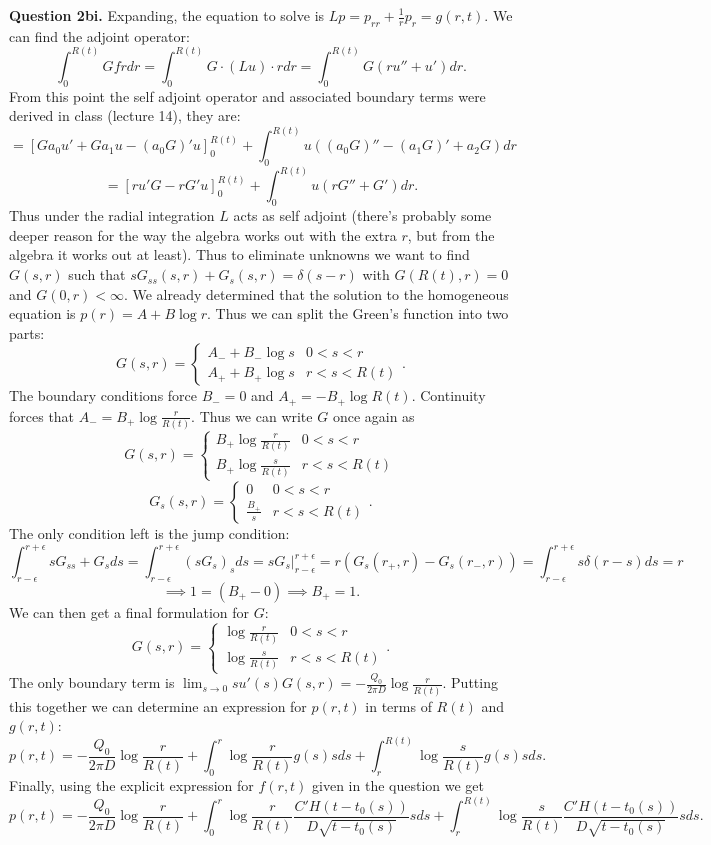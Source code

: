 \documentclass[letterpaper, reqno,11pt]{article}
\begin{document}
{\medskip\noindent\bf Question 2bi.} Expanding, the equation to solve is $Lp=p_{rr}+\frac{1}{r}p_r=g(r,t)$. We can find the adjoint operator:
\[
\int_0^{R(t)}Gfrdr=\int_0^{R(t)}G\cdot (Lu)\cdot rdr=\int_0^{R(t)}G\left( ru''+u' \right) dr
.\]
From this point the self adjoint operator and associated boundary terms were derived in class (lecture 14), they are:
\[
  =\left[Ga_0u'+Ga_1u-(a_0G)'u\right]_{0}^{R(t)}+\int_{0}^{R(t)}u\left( (a_0G)''-(a_1G)'+a_2G \right) dr
\]
\[
  =\left[ru'G-rG'u\right]_0^{R(t)}+\int_0^{R(t)}u\left( rG''+G' \right) dr
.\]
Thus under the radial integration $L$ acts as self adjoint (there's probably some deeper reason for the way the algebra works out with the extra $r$, but from the algebra it works out at least). Thus to eliminate unknowns we want to find $G(s,r)$ such that $sG_{ss}(s,r)+G_s(s,r)=\delta(s-r)$ with $G(R(t),r)=0$ and $G(0,r)<\infty$. We already determined that the solution to the homogeneous equation is $p(r)=A+B\log r$. Thus we can split the Green's function into two parts:
\[
G(s,r)=\begin{cases}
  A_-+B_-\log s&0<s<r\\
  A_++B_+\log s&r<s<R(t)
\end{cases}
.\]
The boundary conditions force $B_-= 0$ and $A_+=-B_+\log R(t)$. Continuity forces that $A_-=B_+\log \frac{r}{R(t)}$. Thus we can write $G$ once again as
\[
G(s,r)=\begin{cases}
  B_+\log \frac{r}{R(t)}&0<s<r\\
  B_+\log \frac{s}{R(t)}&r<s<R(t)
\end{cases}
\]
\[
G_s(s,r)=\begin{cases}
  0&0<s<r\\
  \frac{B_+}{s}&r<s<R(t)
\end{cases}
.\]
The only condition left is the jump condition:
\[
\int_{r-\epsilon}^{r+\epsilon}sG_{ss}+G_sds=\int_{r-\epsilon}^{r+\epsilon}(sG_s)_sds=sG_s\bigg|_{r-\epsilon}^{r+\epsilon}=r\left( G_s(r_+,r)-G_s(r_-,r) \right)=\int_{r-\epsilon}^{r+\epsilon}s\delta(r-s)ds=r
\]
\[
\implies 1=(B_+-0)\implies B_+=1
.\]
We can then get a final formulation for $G$:
\[
G(s,r)=\begin{cases}
  \log \frac{r}{R(t)}&0<s<r\\
  \log \frac{s}{R(t)}&r<s<R(t)
\end{cases}.\]
The only boundary term is $\lim_{s\to 0}su'(s)G(s,r)=-\frac{Q_0}{2\pi D}\log \frac{r}{R(t)}$. Putting this together we can determine an expression for $p(r,t)$ in terms of $R(t)$ and $g(r,t)$:
\[
p(r,t)=-\frac{Q_0}{2\pi D}\log \frac{r}{R(t)}+\int_0^{r}\log \frac{r}{R(t)}g(s)sds+\int_r^{R(t)}\log \frac{s}{R(t)}g(s)sds
.\]
Finally, using the explicit expression for $f(r,t)$ given in the question we get
\[
p(r,t)=-\frac{Q_0}{2\pi D}\log \frac{r}{R(t)}+\int_0^{r}\log \frac{r}{R(t)}\frac{C'H(t-t_0(s))}{D\sqrt{t-t_0(s)}}sds+\int_r^{R(t)}\log \frac{s}{R(t)}\frac{C'H(t-t_0(s))}{D\sqrt{t-t_0(s)}}sds
.\]
\end{document}
